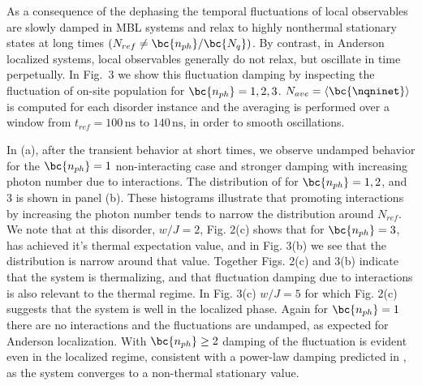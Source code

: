 As a consequence of the dephasing the temporal fluctuations of local observables are slowly damped in MBL systems and relax to highly nonthermal stationary states at long times
$\left( N_{ref} \neq \bc{n_{ph}}/\bc{N_{q}} \right)$.\autocite{Serbyn2014}
By contrast, in Anderson localized systems, local observables generally do not relax, but oscillate in time perpetually.
In Fig.\, 3 we show this fluctuation damping by inspecting the fluctuation of on-site population  for $\bc{n_{ph}}=1,2,3$.
$N_{ave} = \left< \bc{\nqninet} \right>$ is computed for each disorder instance and the averaging is performed over a window from $t_{ref}=\text{100}\,\text{ns}$ to $\text{140}\,\text{ns}$, in order to smooth oscillations.

In (a),  after the transient behavior at short times, we observe undamped behavior for the $\bc{n_{ph}}=1$ non-interacting case and stronger damping with increasing photon number due to interactions.
The distribution of  for $\bc{n_{ph}}=1,2$, and $3$ is shown in panel (b).
These histograms illustrate that promoting interactions by increasing the photon number tends to narrow the distribution around $N_{ref}$.
We note that at this disorder, $w/J=2$, Fig. 2(c) shows that for $\bc{n_{ph}}=3$,
\bc{$\overline{\nqninet}$} has achieved it's thermal expectation value,
and in Fig. 3(b) we see that the distribution is narrow around that value.
Together Figs. 2(c) and 3(b) indicate that the system is thermalizing, and that fluctuation damping due to interactions is also relevant to the thermal regime.
In Fig. 3(c) $w/J=5$ for which Fig. 2(c) suggests that the system is well in the localized phase.
Again for $\bc{n_{ph}}=1$ there are no interactions and the fluctuations are undamped, as expected for Anderson localization.
With $\bc{n_{ph}}\geq 2$ damping of the fluctuation is evident even in the localized regime, consistent with a power-law damping predicted in \cite{Serbyn2014}, as the system converges to a non-thermal stationary value.

